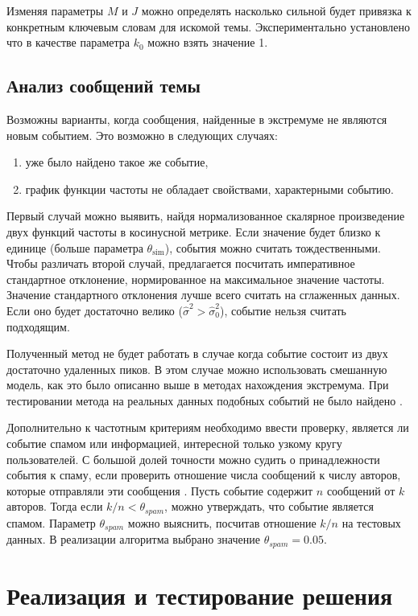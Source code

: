 \documentclass[12pt, a4paper]{article}
\DeclareMathOperator{\simu}{sim}
\begin{document}
  Изменяя параметры $M$ и $J$ можно определять насколько сильной будет привязка к конкретным ключевым словам для искомой темы. Экспериментально установлено что в качестве параметра $k_0$ можно взять значение 1.
  
  \subsection{Анализ сообщений темы}
  Возможны варианты, когда сообщения, найденные в экстремуме не являются новым событием. Это возможно в следующих случаях:
  \begin{enumerate}
  \item уже было найдено такое же событие,
  \item график функции частоты не обладает свойствами, характерными событию.
  \end{enumerate}
  
  Первый случай можно выявить, найдя нормализованное скалярное произведение двух функций частоты в косинусной метрике. Если значение будет близко к единице (больше параметра $\theta_{\simu}$), события можно считать тождественными. Чтобы различать второй случай, предлагается посчитать императивное стандартное отклонение, нормированное на максимальное значение частоты. Значение стандартного отклонения лучше всего считать на сглаженных данных. Если оно будет достаточно велико ($\hat{\sigma}^2 > \hat{\sigma}^2_0$), событие нельзя считать подходящим.  
  
  Полученный метод не будет работать в случае когда событие состоит из двух достаточно удаленных пиков. В этом случае можно использовать смешанную модель, как это было описанно выше в методах нахождения экстремума. При тестировании метода на реальных данных подобных событий не было найдено \cite{blei-sd}.
  
  Дополнительно к частотным критериям необходимо ввести проверку, является ли событие спамом или информацией, интересной только узкому кругу пользователей. С большой долей точности можно судить о принадлежности события к спаму, если проверить отношение числа сообщений к числу авторов, которые отправляли эти сообщения \cite{fsd}. Пусть событие содержит $n$ сообщений от $k$ авторов. Тогда если $k/n<\theta_{spam}$, можно утверждать, что событие является спамом. Параметр $\theta_{spam}$ можно выяснить, посчитав отношение $k/n$ на тестовых данных. В реализации алгоритма выбрано значение $\theta_{spam}=0.05$.
  

  \section{Реализация и тестирование решения}
  
\end{document}
